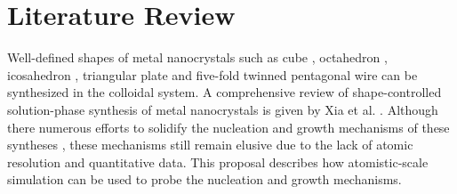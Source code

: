 \section{Literature Review}

Well-defined shapes of metal nanocrystals such as cube \cite{Im_2005}, octahedron \cite{Xia_2012}, icosahedron \cite{Xiong_2007}, triangular plate \cite{Lofton_2005} and five-fold twinned pentagonal wire \cite{Tsuji_2008} can be synthesized in the colloidal system.
A comprehensive review of shape-controlled solution-phase synthesis of metal nanocrystals is given by Xia et al. \cite{Xia_2008,Xia_2015}.
Although there numerous efforts to solidify the nucleation and growth mechanisms of these syntheses \cite{Lofton_2005,Mariscal_2012,Park_2013,Viswanath_2009,Liao_2014,Chang_2011,Murph_2015}, these mechanisms still remain elusive due to the lack of atomic resolution and quantitative data. This proposal describes how atomistic-scale simulation can be used to probe the nucleation and growth mechanisms.
    
    
